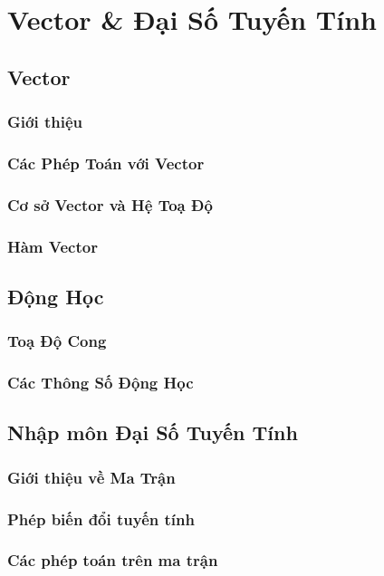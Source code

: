   
\chapter{Vector \& Đại Số Tuyến Tính}


\section{Vector}
\subsection{Giới thiệu}
\subsection{Các Phép Toán với Vector}
\subsection{Cơ sở Vector và Hệ Toạ Độ}
\subsection{Hàm Vector}

\section{Động Học}
\subsection{Toạ Độ Cong}
\subsection{Các Thông Số Động Học}

\section{Nhập môn Đại Số Tuyến Tính}
\subsection{Giới thiệu về Ma Trận}
\subsection{Phép biến đổi tuyến tính}
\subsection{Các phép toán trên ma trận}